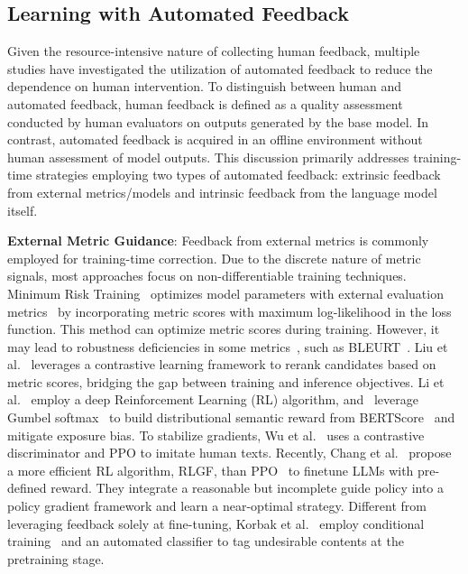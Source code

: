 \documentclass[a4paper,oneside]{book}
\begin{document}
\subsection{Learning with Automated Feedback}
Given the resource-intensive nature of collecting human feedback, multiple studies have investigated the utilization of automated feedback to reduce the dependence on human intervention. To distinguish between human and automated feedback, human feedback is defined as a quality assessment conducted by human evaluators on outputs generated by the base model. In contrast, automated feedback is acquired in an offline environment without human assessment of model outputs. This discussion primarily addresses training-time strategies employing two types of automated feedback: extrinsic feedback from external metrics/models and intrinsic feedback from the language model itself.

\textbf{External Metric Guidance}: Feedback from external metrics is commonly employed for training-time correction. Due to the discrete nature of metric signals, most approaches focus on non-differentiable training techniques. Minimum Risk Training~\cite{shen-etal-2016-minimum} optimizes model parameters with external evaluation metrics~\cite{xu-etal-2022-errors, xu-etal-2023-sescore2} by incorporating metric scores with maximum log-likelihood in the loss function. This method can optimize metric scores during training. However, it may lead to robustness deficiencies in some metrics~\cite{yan-etal-2023-bleurt}, such as BLEURT~\cite{sellam-etal-2020-bleurt}. Liu et al.~\cite{liu-liu-2021-simcls} leverages a contrastive learning framework to rerank candidates based on metric scores, bridging the gap between training and inference objectives. Li et al.~\cite{li-etal-2019-deep} employ a deep Reinforcement Learning (RL) algorithm, and~\cite{jauregi-unanue-etal-2021-berttune} leverage Gumbel softmax~\cite{jang2017categorical} to build distributional semantic reward from BERTScore~\cite{zhang2020bertscore} and mitigate exposure bias. To stabilize gradients, Wu et al.~\cite{wu2021textgail} uses a contrastive discriminator and PPO to imitate human texts. Recently, Chang et al.~\cite{chang2023learning} propose a more efficient RL algorithm, RLGF, than PPO~\cite{schulman2017proximal} to finetune LLMs with pre-defined reward. They integrate a reasonable but incomplete guide policy into a policy gradient framework and learn a near-optimal strategy. Different from leveraging feedback solely at fine-tuning, Korbak et al.~\cite{korbak2023pretraining} employ conditional training~\cite{keskar2019ctrl} and an automated classifier to tag undesirable contents at the pretraining stage.
\end{document}
